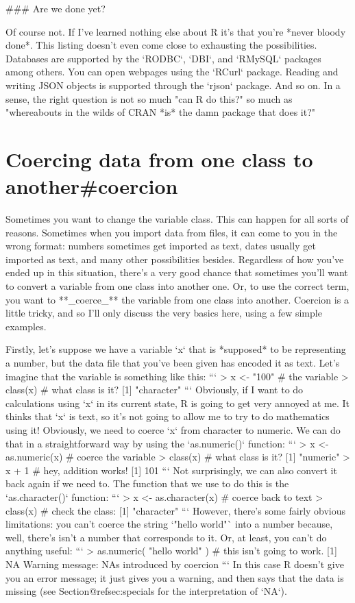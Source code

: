### Are we done yet?

Of course not. If I've learned nothing else about R it's that you're *never bloody done*. This listing doesn't even come close to exhausting the possibilities. Databases are supported by the `RODBC`, `DBI`, and `RMySQL` packages among others. You can open webpages using the `RCurl` package. Reading and writing JSON objects is supported through the `rjson` package. And so on. In a sense, the right question is not so much "can R do this?" so much as "whereabouts in the wilds of CRAN *is* the damn package that does it?"









\section{Coercing data from one class to another{#coercion}}

Sometimes you want to change the variable class. This can happen for all sorts of reasons. Sometimes when you import data from files, it can come to you in the wrong format: numbers sometimes get imported as text, dates usually get imported as text, and many other possibilities besides. Regardless of how you've ended up in this situation, there's a very good chance that sometimes you'll want to convert a variable from one class into another one. Or, to use the correct term, you want to **_coerce_** the variable from one class into another. Coercion is a little tricky, and so I'll only discuss the very basics here, using a few simple examples. 

Firstly, let's suppose we have a variable `x` that is *supposed* to be representing a number, but the data file that you've been given has encoded it as text. Let's imagine that the variable is something like this:
```
> x <- "100"  # the variable 
> class(x)    # what class is it?
[1] "character"
```
Obviously, if I want to do calculations using `x` in its current state, R is going to get very annoyed at me. It thinks that `x` is text, so it's not going to allow me to try to do mathematics using it! Obviously, we need to coerce `x` from character to numeric. We can do that in a straightforward way by using the `as.numeric()` function: 
```
> x <- as.numeric(x)  # coerce the variable
> class(x)            # what class is it?
[1] "numeric"
> x + 1               # hey, addition works!
[1] 101
```
Not surprisingly, we can also convert it back again if we need to. The function that we use to do this is the `as.character()` function:
```
> x <- as.character(x)   # coerce back to text
> class(x)               # check the class:
[1] "character"
```
However, there's some fairly obvious limitations: you can't coerce the string `"hello world"` into a number because, well, there's isn't a number that corresponds to it. Or, at least, you can't do anything useful:
```
> as.numeric( "hello world" )  # this isn't going to work.
[1] NA
Warning message:
NAs introduced by coercion
```
In this case R doesn't give you an error message; it just gives you a warning, and then says that the data is missing (see Section@refsec:specials for the interpretation of `NA`). 

